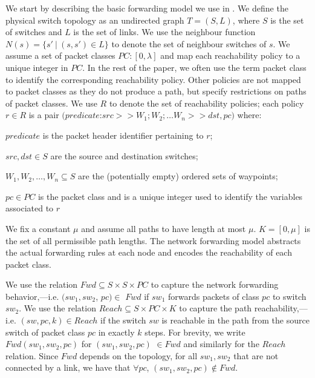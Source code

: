 We start by describing the basic forwarding model we use in \Name.
We define the physical switch topology as an undirected graph $T=(S, L)$,
where $S$ is the set of switches and $L$ is the set of links. 
We use the neighbour function $N(s) = \{s'\ | \ (s,s') \in L \}$ to denote 
the set of neighbour switches of $s$. 
We assume a set of packet classes $PC : [0,\lambda]$ 
and map each reachability policy to a unique integer in $PC$. In the rest of the paper, 
we often use the term packet class to identify the corresponding reachability policy. 
Other policies are not mapped to packet classes as they do not produce a path, but specify restrictions on paths of packet classes. 
We use $R$ to denote the set of reachability policies; each policy $r \in R$ is
a pair
$(predicate$:$src >> W_1;W_2; \ldots W_n >> dst, pc)$ where:
\begin{compactitemize}
\item  $predicate$ is the packet header identifier pertaining to $r$;
\item  $src,dst \in S$ are the source and destination switches;
\item $W_1, W_2, \ldots, W_n \subseteq S$ are the (potentially empty) ordered sets of waypoints; 
\item $pc \in PC$ is the packet class and is a unique integer used to identify the variables associated to $r$
\end{compactitemize} 
We fix a constant $\mu$ and assume all paths to have length at most $\mu$. 
$K=[0,\mu]$ is the set of all permissible path lengths. The network forwarding
 model abstracts the actual forwarding rules at each node and encodes 
 the reachability of each packet class. 
 
We use the relation $Fwd \subseteq S \times S \times PC $  to capture 
the network forwarding behavior,---i.e. 
$(sw_1, sw_2$, $pc)\in$ $Fwd$ if 
$sw_1$ forwards packets of class $pc$ to switch $sw_2$. 
	We use the relation $Reach \subseteq S \times PC \times K$ to capture
	 the path reachability,---i.e. $(sw, pc, k)\in Reach$ if 
	the switch $sw$ is reachable in the path from the source
	 switch of packet class $pc$ in exactly $k$ steps.  
For brevity, we write $Fwd(sw_1, sw_2, pc)$ for $(sw_1, sw_2, pc) $ $\in Fwd$ and similarly for the $Reach$ relation. 
Since $Fwd$ depends on the topology,
for all $sw_1, sw_2$ that are not connected by a link, 
we have that $\forall pc$, $(sw_1,sw_2,pc) \notin Fwd$. 

